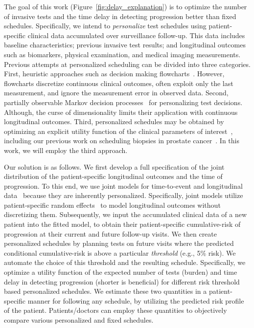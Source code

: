 The goal of this work (Figure~\ref{fig:delay_explanation}) is to optimize the number of invasive tests and the time delay in detecting progression better than fixed schedules. Specifically, we intend to \emph{personalize} test schedules using patient-specific clinical data accumulated over surveillance follow-up. This data includes baseline characteristics; previous invasive test results; and longitudinal outcomes such as biomarkers, physical examination, and medical imaging measurements. Previous attempts at personalized scheduling can be divided into three categories. First, heuristic approaches such as decision making flowcharts~\citep{bokhorst2015compliance,weusten2017endoscopic}. However, flowcharts discretize continuous clinical outcomes, often exploit only the last measurement, and ignore the measurement error in observed data. Second, partially observable Markov decision processes~\citep{alagoz2010operations, steimle2017markov} for personalizing test decisions. Although, the curse of dimensionality limits their application with continuous longitudinal outcomes. Third, personalized schedules may be obtained by optimizing an explicit utility function of the clinical parameters of interest~\citep{bebu2017optimal,rizopoulos2015personalized}, including our previous work on scheduling biopsies in prostate cancer~\citep{tomer2019personalized,tomer2020webapp}. In this work, we will employ the third approach.

Our solution is as follows. We first develop a full specification of the joint distribution of the patient-specific longitudinal outcomes and the time of progression. To this end, we use joint models for time-to-event and longitudinal data~\citep{tsiatis2004joint,rizopoulos2012joint} because they are inherently personalized. Specifically, joint models utilize patient-specific random effects~\citep{mcculloch2005generalized} to model longitudinal outcomes without discretizing them. Subsequently, we input the accumulated clinical data of a new patient into the fitted model, to obtain their patient-specific cumulative-risk of progression at their current and future follow-up visits. We then create personalized schedules by planning tests on future visits where the predicted conditional cumulative-risk is above a particular \emph{threshold} (e.g., 5\% risk). We automate the choice of this threshold and the resulting schedule. Specifically, we optimize a utility function of the expected number of tests (burden) and time delay in detecting progression (shorter is beneficial) for different risk threshold based personalized schedules. We estimate these two quantities in a patient-specific manner for following any schedule, by utilizing the predicted risk profile of the patient. Patients/doctors can employ these quantities to objectively compare various personalized and fixed schedules.

